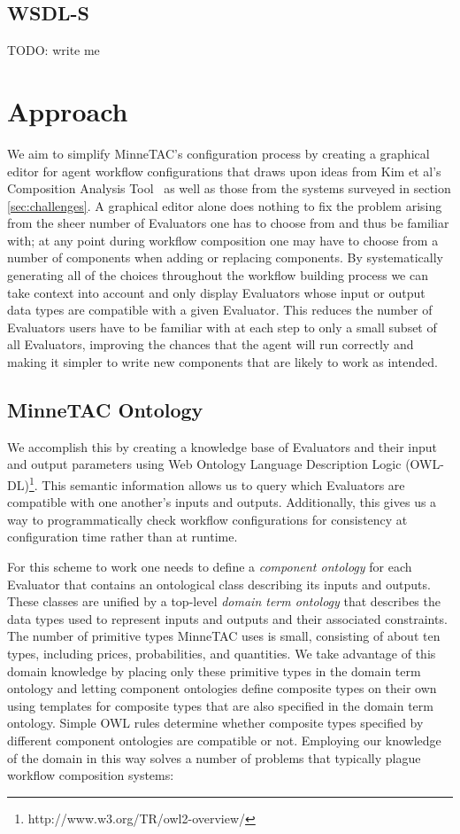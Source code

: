 \documentclass{article}
\begin{document}
\subsection{WSDL-S}

TODO:  write me

\section{Approach}

We aim to simplify MinneTAC's configuration process by creating a graphical editor for agent workflow configurations that draws upon ideas from Kim et al's Composition Analysis Tool~\cite{kim2004intelligent} as well as those from the systems surveyed in section \ref{sec:challenges}.
A graphical editor alone does nothing to fix the problem arising from the sheer number of Evaluators one has to choose from and thus be familiar with; at any point during workflow composition one may have to choose from a number of components when adding or replacing components.
By systematically generating all of the choices throughout the workflow building process we can take context into account and only display Evaluators whose input or output data types are compatible with a given Evaluator.
This reduces the number of Evaluators users have to be familiar with at each step to only a small subset of all Evaluators, improving the chances that the agent will run correctly and making it simpler to write new components that are likely to work as intended.

\subsection{MinneTAC Ontology}

We accomplish this by creating a knowledge base of Evaluators and their input and output parameters using Web Ontology Language Description Logic (OWL-DL)\footnote{http://www.w3.org/TR/owl2-overview/}.
This semantic information allows us to query which Evaluators are compatible with one another's inputs and outputs.
Additionally, this gives us a way to programmatically check workflow configurations for consistency at configuration time rather than at runtime.

For this scheme to work one needs to define a \emph{component ontology} for each Evaluator that contains an ontological class describing its inputs and outputs.
These classes are unified by a top-level \emph{domain term ontology} that describes the data types used to represent inputs and outputs and their associated constraints.
The number of primitive types MinneTAC uses is small, consisting of about ten types, including prices, probabilities, and quantities.
We take advantage of this domain knowledge by placing only these primitive types in the domain term ontology and letting component ontologies define composite types on their own using templates for composite types that are also specified in the domain term ontology.
Simple OWL rules determine whether composite types specified by different component ontologies are compatible or not.
Employing our knowledge of the domain in this way solves a number of problems that typically plague workflow composition systems:
\end{document}
